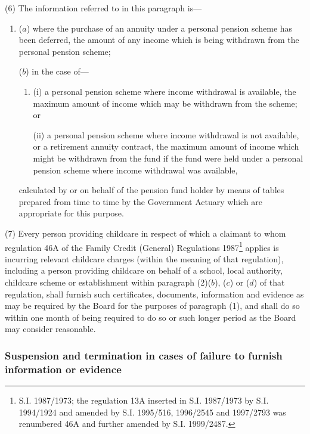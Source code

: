 \documentclass[12pt,a4paper]{article}
\begin{document}
(6) The information referred to in this paragraph is—
\begin{enumerate}\item[]
($a$) where the purchase of an annuity under a personal pension scheme has been deferred, the amount of any income which is being withdrawn from the personal pension scheme;

($b$) in the case of—
\begin{enumerate}\item[]
(i) a personal pension scheme where income withdrawal is available, the maximum amount of income which may be withdrawn from the scheme; or

(ii) a personal pension scheme where income withdrawal is not available, or a retirement annuity contract, the maximum amount of income which might be withdrawn from the fund if the fund were held under a personal pension scheme where income withdrawal was available,
\end{enumerate}
calculated by or on behalf of the pension fund holder by means of tables prepared from time to time by the Government Actuary which are appropriate for this purpose.
\end{enumerate}

(7) Every person providing childcare in respect of which a claimant to whom regulation 46A of the Family Credit (General) Regulations 1987\footnote{\frenchspacing S.I. 1987/1973; the regulation 13A inserted in S.I. 1987/1973 by S.I. 1994/1924 and amended by S.I. 1995/516, 1996/2545 and 1997/2793 was renumbered 46A and further amended by S.I. 1999/2487.} applies is incurring relevant childcare charges (within the meaning of that regulation), including a person providing childcare on behalf of a school, local authority, childcare scheme or establishment within paragraph (2)($b$), ($c$)  or ($d$)  of that regulation, shall furnish such certificates, documents, information and evidence as may be required by the Board for the purposes of paragraph (1), and shall do so within one month of being required to do so or such longer period as the Board may consider reasonable.


\subsubsection[18. Suspension and termination in cases of failure to furnish information or evidence]{Suspension and termination in cases of failure to furnish information or evidence}
\end{document}
